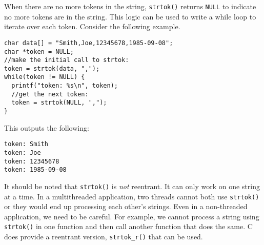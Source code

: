 When there are no more tokens in the string, 
\texttt{strtok()} returns \texttt{NULL} 
to indicate no more tokens are in the string.  This
logic can be used to write a while loop to iterate
over each token.  Consider the following example.

\begin{verbatim}
char data[] = "Smith,Joe,12345678,1985-09-08";
char *token = NULL;
//make the initial call to strtok:
token = strtok(data, ",");
while(token != NULL) {
  printf("token: %s\n", token);
  //get the next token:
  token = strtok(NULL, ",");
}
\end{verbatim}

This outputs the following:

\begin{verbatim}
token: Smith
token: Joe
token: 12345678
token: 1985-09-08
\end{verbatim}


It should be noted that \texttt{strtok()} is
\emph{not} \gls{reentrant}.  It can only work on 
one string at a time.  In a multithreaded application, 
two threads cannot both use \texttt{strtok()}
or they would end up processing each other's strings.
Even in a non-threaded application, we need to be
careful.  For example, we cannot process a string using
\texttt{strtok()} in one function and then call
another function that does the same.  C does provide
a reentrant version, \texttt{strtok_r()} that
can be used.


